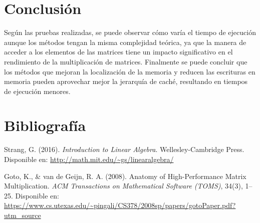 \documentclass[10pt]{article}
\begin{document}
\section{Conclusión}

Según las pruebas realizadas, se puede observar cómo varía el tiempo de ejecución aunque los métodos tengan la misma complejidad teórica, ya que 
la manera de acceder a los elementos de las matrices tiene un impacto significativo en el rendimiento de la multiplicación de matrices. Finalmente se puede concluir que los métodos que mejoran la localización de la memoria y reducen las escrituras en memoria pueden aprovechar mejor la jerarquía de caché, resultando en tiempos de ejecución menores.

\section{Bibliografía}

\begin{thebibliography}{9}

Strang, G. (2016). \textit{Introduction to Linear Algebra}. Wellesley-Cambridge Press. Disponible en: \url{http://math.mit.edu/~gs/linearalgebra/}

Goto, K., \& van de Geijn, R. A. (2008). Anatomy of High-Performance Matrix Multiplication. \textit{ACM Transactions on Mathematical Software (TOMS)}, 34(3), 1–25. Disponible en: \url{https://www.cs.utexas.edu/~pingali/CS378/2008sp/papers/gotoPaper.pdf?utm_source}

\end{thebibliography}
\end{document}
